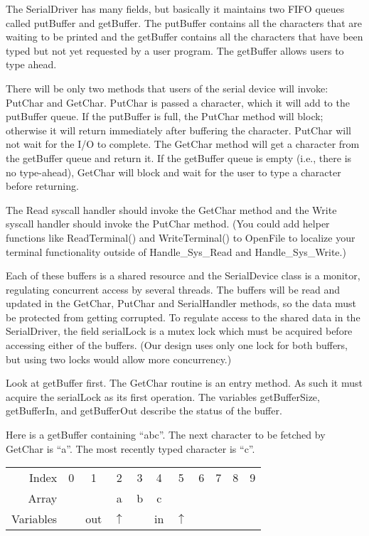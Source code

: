 \documentclass[11pt]{article}
\begin{document}
The SerialDriver has many fields, but basically it maintains two FIFO
queues called putBuffer and getBuffer.  The putBuffer contains all the
characters that are waiting to be printed and the getBuffer contains
all the characters that have been typed but not yet requested by a
user program.  The getBuffer allows users to type ahead.

There will be only two methods that users of the serial device will
invoke: PutChar and GetChar.  PutChar is passed a character, which it
will add to the putBuffer queue.  If the putBuffer is full, the
PutChar method will block; otherwise it will return immediately after
buffering the character.  PutChar will not wait for the I/O to
complete.  The GetChar method will get a character from the getBuffer
queue and return it.  If the getBuffer queue is empty (i.e., there is
no type-ahead), GetChar will block and wait for the user to type a
character before returning.

The Read syscall handler should invoke the GetChar method and the
Write syscall handler should invoke the PutChar method.  (You could
add helper functions like ReadTerminal() and WriteTerminal() to
OpenFile to localize your terminal functionality outside of
Handle\_Sys\_Read and Handle\_Sys\_Write.)

Each of these buffers is a shared resource and the SerialDevice class
is a monitor, regulating concurrent access by several threads.  The
buffers will be read and updated in the GetChar, PutChar and
SerialHandler methods, so the data must be protected from getting
corrupted.  To regulate access to the shared data in the SerialDriver,
the field serialLock is a mutex lock which must be acquired before
accessing either of the buffers.  (Our design uses only one lock for
both buffers, but using two locks would allow more concurrency.)

Look at getBuffer first.  The GetChar routine is an entry method.  As
such it must acquire the serialLock as its first operation.  The
variables getBufferSize, getBufferIn, and getBufferOut describe the
status of the buffer.

Here is a getBuffer containing ``abc''.  The next character to be
fetched by GetChar is ``a''.  The most recently typed character is ``c''.

\vspace{.2in}

\begin{tabular}{r|c|c|c|c|c|c|c|c|c|c|}
Index &0&1&2&3&4&5&6&7&8&9 \\
\cline{2-11}
Array &&&a&b&c&&&&& \\
\cline {2-11}
Variables & & out & $\uparrow$ & & in & $\uparrow$ &&&& \\
\end{tabular}
\end{document}
